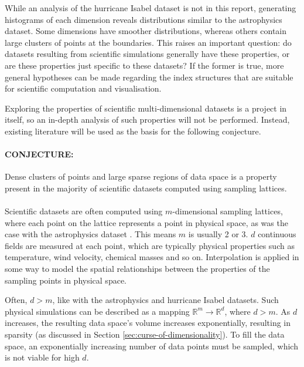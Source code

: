 While an analysis of the hurricane Isabel dataset is not in this report, generating histograms of each dimension reveals distributions similar to the astrophysics dataset. Some dimensions have smoother distributions, whereas others contain large clusters of points at the boundaries. This raises an important question: do datasets resulting from scientific simulations generally have these properties, or are these properties just specific to these datasets? If the former is true, more general hypotheses can be made regarding the index structures that are suitable for scientific computation and visualisation.

Exploring the properties of scientific multi-dimensional datasets is a project in itself, so an in-depth analysis of such properties will not be performed. Instead, existing literature will be used as the basis for the following conjecture.

\paragraph{\textbf{CONJECTURE:}} Dense clusters of points and large sparse regions of data space is a property present in the majority of scientific datasets computed using sampling lattices. 
\paragraph{}

Scientific datasets are often computed using $m$-dimensional sampling lattices, where each point on the lattice represents a point in physical space, as was the case with the astrophysics dataset \cite{astrophysics-dataset}. This means $m$ is usually 2 or 3. $d$ continuous fields are measured at each point, which are typically physical properties such as temperature, wind velocity, chemical masses and so on. Interpolation is applied in some way to model the spatial relationships between the properties of the sampling points in physical space.

Often, $d > m$, like with the astrophysics and hurricane Isabel datasets. Such physical simulations can be described as a mapping $\mathbb{R}^m \rightarrow \mathbb{R}^d$, where $d > m$. As $d$ increases, the resulting data space's volume increases exponentially, resulting in sparsity (as discussed in Section \ref{sec:curse-of-dimensionality}). To fill the data space, an exponentially increasing number of data points must be sampled, which is not viable for high $d$.

